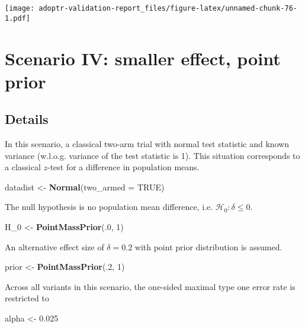 \documentclass[]{book}
\newenvironment{Shaded}{\begin{snugshade}}{\end{snugshade}}
\newcommand{\DataTypeTok}[1]{\textcolor[rgb]{0.13,0.29,0.53}{#1}}
\newcommand{\DecValTok}[1]{\textcolor[rgb]{0.00,0.00,0.81}{#1}}
\newcommand{\FloatTok}[1]{\textcolor[rgb]{0.00,0.00,0.81}{#1}}
\newcommand{\KeywordTok}[1]{\textcolor[rgb]{0.13,0.29,0.53}{\textbf{#1}}}
\newcommand{\NormalTok}[1]{#1}
\newcommand{\OtherTok}[1]{\textcolor[rgb]{0.56,0.35,0.01}{#1}}
\newcommand{\StringTok}[1]{\textcolor[rgb]{0.31,0.60,0.02}{#1}}
\begin{document}
\texttt{[image: adoptr-validation-report\_files/figure-latex/unnamed-chunk-76-1.pdf]}

\hypertarget{scenarioIV}{%
\chapter{Scenario IV: smaller effect, point prior}\label{scenarioIV}}

\hypertarget{details-3}{%
\section{Details}\label{details-3}}

In this scenario, a classical two-arm trial with normal
test statistic and known variance (w.l.o.g. variance of
the test statistic is 1).
This situation corresponds to a classical \(z\)-test for
a difference in population means.

\begin{Shaded}
\begin{Highlighting}[]
\NormalTok{datadist <-}\StringTok{ }\KeywordTok{Normal}\NormalTok{(}\DataTypeTok{two_armed =} \OtherTok{TRUE}\NormalTok{)}
\end{Highlighting}
\end{Shaded}

The null hypothesis is no population mean difference, i.e.
\(\mathcal{H}_0:\delta \leq 0\).

\begin{Shaded}
\begin{Highlighting}[]
\NormalTok{H_}\DecValTok{0}\NormalTok{ <-}\StringTok{ }\KeywordTok{PointMassPrior}\NormalTok{(.}\DecValTok{0}\NormalTok{, }\DecValTok{1}\NormalTok{)}
\end{Highlighting}
\end{Shaded}

An alternative effect size of \(\delta = 0.2\) with
point prior distribution is assumed.

\begin{Shaded}
\begin{Highlighting}[]
\NormalTok{prior <-}\StringTok{ }\KeywordTok{PointMassPrior}\NormalTok{(.}\DecValTok{2}\NormalTok{, }\DecValTok{1}\NormalTok{)}
\end{Highlighting}
\end{Shaded}

Across all variants in this scenario, the one-sided maximal
type one error rate is restricted to

\begin{Shaded}
\begin{Highlighting}[]
\NormalTok{alpha <-}\StringTok{ }\FloatTok{0.025}
\end{Highlighting}
\end{Shaded}
\end{document}
